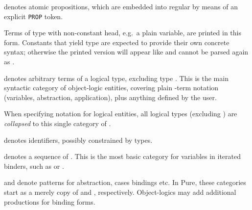 \begin{isabellebody}
\begin{isamarkuptext}
\begin{description}
  \item {}\hyperlink{syntax.inner.aprop}{\mbox{}} denotes atomic propositions, which
  are embedded into regular \hyperlink{syntax.inner.prop}{\mbox{}} by means of an
  explicit \verb|PROP| token.

  Terms of type  with non-constant head, e.g.\ a plain
  variable, are printed in this form.  Constants that yield type  are expected to provide their own concrete syntax; otherwise
  the printed version will appear like \hyperlink{syntax.inner.logic}{\mbox{}} and
  cannot be parsed again as \hyperlink{syntax.inner.prop}{\mbox{}}.

  \item {}\hyperlink{syntax.inner.logic}{\mbox{}} denotes arbitrary terms of a
  logical type, excluding type .  This is the main
  syntactic category of object-logic entities, covering plain \isa{{\isasymlambda}}-term notation (variables, abstraction, application), plus
  anything defined by the user.

  When specifying notation for logical entities, all logical types
  (excluding ) are \emph{collapsed} to this single category
  of \hyperlink{syntax.inner.logic}{\mbox{}}.

  \item {}\hyperlink{syntax.inner.idt}{\mbox{}} denotes identifiers, possibly
  constrained by types.

  \item {}\hyperlink{syntax.inner.idts}{\mbox{}} denotes a sequence of \hyperlink{syntax.inner.idt}{\mbox{}}.  This is the most basic category for variables in
  iterated binders, such as \isa{{\isachardoublequote}{\isasymlambda}{\isachardoublequote}} or \isa{{\isachardoublequote}{\isasymAnd}{\isachardoublequote}}.

  \item {}\hyperlink{syntax.inner.pttrn}{\mbox{}} and \hyperlink{syntax.inner.pttrns}{\mbox{}}
  denote patterns for abstraction, cases bindings etc.  In Pure, these
  categories start as a merely copy of \hyperlink{syntax.inner.idt}{\mbox{}} and
  \hyperlink{syntax.inner.idts}{\mbox{}}, respectively.  Object-logics may add
  additional productions for binding forms.


\end{description}
\end{isamarkuptext}
\end{isabellebody}
